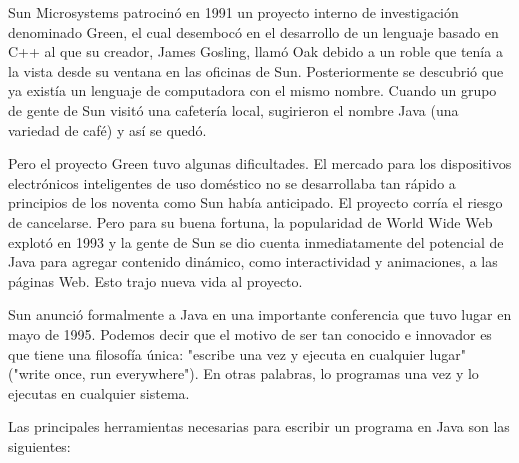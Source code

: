 Sun Microsystems patrocinó en 1991 un proyecto interno de investigación
 denominado Green, el cual desembocó en el desarrollo de un lenguaje basado en C++ al que su creador, James
 Gosling, llamó Oak debido a un roble que tenía a la vista desde su ventana en las oficinas de Sun. Posteriormente
se descubrió que ya existía un lenguaje de computadora con el mismo nombre. Cuando un grupo de gente de Sun
visitó una cafetería local, sugirieron el nombre Java (una variedad de café) y así se quedó.

Pero el proyecto Green tuvo algunas dificultades. El mercado para los dispositivos electrónicos inteligentes de
uso doméstico no se desarrollaba tan rápido a principios de los noventa como Sun había anticipado. El proyecto
corría el riesgo de cancelarse. Pero para su buena fortuna, la popularidad de World Wide Web explotó en 1993
y la gente de Sun se dio cuenta inmediatamente del potencial de Java para agregar contenido dinámico, como
interactividad y animaciones, a las páginas Web. Esto trajo nueva vida al proyecto.

Sun anunció formalmente a Java en una importante conferencia que tuvo lugar en mayo de 1995. Podemos decir que el motivo de ser tan conocido e innovador es que tiene una filosofía única: "escribe una vez y ejecuta en cualquier lugar" ("write once, run everywhere"). En otras palabras, lo programas una vez y lo ejecutas en cualquier sistema. 

Las principales herramientas necesarias para escribir un programa en Java son las siguientes:

